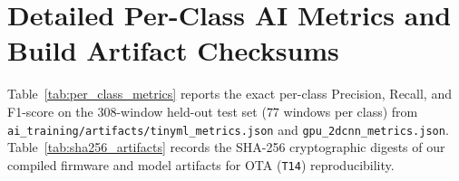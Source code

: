 \documentclass{hcmut-report}
\begin{document}
\section[Per-Class AI Metrics \& Build Checksums]{Detailed Per-Class AI Metrics and Build Artifact Checksums}
\label{app:metrics}

Table~\ref{tab:per_class_metrics} reports the exact per-class Precision, Recall, and F1-score on the 308-window held-out test set ($77$ windows per class) from \texttt{ai\_training/\allowbreak artifacts/\allowbreak tinyml\_metrics.json} and \texttt{gpu\_2dcnn\_metrics.json}. Table~\ref{tab:sha256_artifacts} records the SHA-256 cryptographic digests of our compiled firmware and model artifacts for OTA (\texttt{T14}) reproducibility.

\begin{table}[H]
\centering
\caption{Per-Class Precision, Recall, and F1-Score on Held-Out Test Set ($N = 308$ Windows)}
\label{tab:per_class_metrics}
\end{table}
\end{document}
